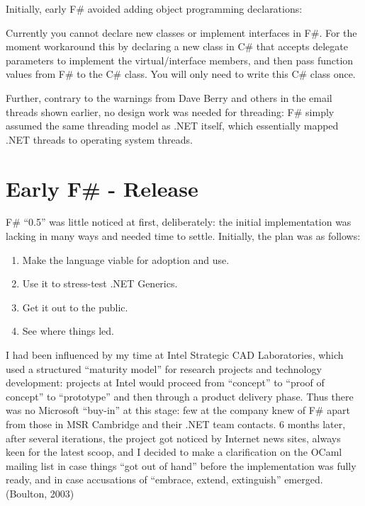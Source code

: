 \documentclass[acmsmall,review]{acmart}\settopmatter{printfolios=true,printccs=false,printacmref=false}
\begin{document}
Initially, early F\# avoided adding object programming declarations:
\begin{verbquote}
Currently you cannot declare new classes or implement interfaces in F\#.  For the moment workaround this by declaring a new class in C\# that accepts delegate parameters to implement the virtual/interface members, and then pass function values from F\# to the C\# class.  You will only need to write this C\# class once.  \end{verbquote}

Further, contrary to the warnings from Dave Berry and others in the email threads shown earlier, no design work was needed for threading: F\# simply assumed the same threading model as .NET itself, which essentially mapped .NET threads to operating system threads.



\section*{Early F\# - Release}


F\# “0.5” was little noticed at first, deliberately: the initial implementation was lacking in many ways and needed time to settle. Initially, the plan was as follows: 
\begin{enumerate}
\item Make the language viable for adoption and use.
\item Use it to stress-test .NET Generics.
\item Get it out to the public.
\item See where things led.
\end{enumerate}

I had been influenced by my time at Intel Strategic CAD Laboratories, which used a structured “maturity model” for research projects and technology development: projects at Intel would proceed from “concept” to “proof of concept” to “prototype” and then through a product delivery phase. Thus there was no Microsoft “buy-in” at this stage: few at the company knew of F\# apart from those in MSR Cambridge and their .NET team contacts. 6 months later, after several iterations, the project got noticed by Internet news sites, always keen for the latest scoop, and I decided to make a clarification on the OCaml mailing list in case things “got out of hand” before the implementation was fully ready, and in case accusations of “embrace, extend, extinguish” emerged. (Boulton, 2003)
\end{document}
